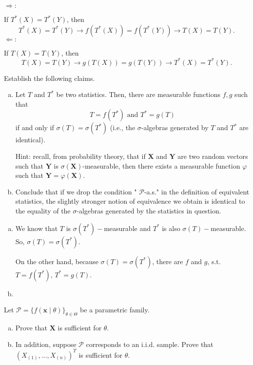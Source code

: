 \begin{solution}
    $\Rightarrow: $

    If $T^*(X)=T^*(Y)$, then
    \[
        T^*(X)=T^*(Y)\rightarrow f(T^*(X))=f(T^*(Y))\rightarrow T(X)=T(Y). 
    \]
    $\Leftarrow: $

    If $T(X)=T(Y)$, then
    \[
        T(X)=T(Y)\rightarrow g(T(X))=g(T(Y))\rightarrow T^*(X)=T^*(Y). 
    \]
\end{solution}

\begin{exercise}
    Establish the following claims. 
    \begin{enumerate}[(a)]
        \item Let \(T\) and \(T^{*}\) be two statistics. Then, there are measurable functions \(f, g\) such that 
        \[
            T=f\left(T^{*}\right)\text{ and }T^{*}=g(T)
        \]
        if and only if \(\sigma(T)=\sigma\left(T^{*}\right)\)
        (i.e., the \(\sigma\)-algebras generated by \(T\) and \(T^{*}\) are identical). 
        
        Hint: recall, from probability theory, that if \(\mathbf{X}\) and \(\mathbf{Y}\) are two random vectors such that \(\mathbf{Y}\) is \(\sigma(\mathbf{X})\)-measurable, then there exists a measurable function \(\varphi\) such that \(\mathbf{Y}=\varphi(\mathbf{X})\). 
        \item Conclude that if we drop the condition " \(\mathcal{P}\)-a.s." in the definition of equivalent statistics, the slightly stronger notion of equivalence we obtain is identical to the equality of the \(\sigma\)-algebras generated by the statistics in question. 
    \end{enumerate}
\end{exercise}

\begin{solution}
    \begin{enumerate}[(a)]
        \item We know that $T$ is $\sigma(T^*)-$measurable and $T^*$ is also $\sigma(T)-$measurable. So, $\sigma(T)=\sigma(T^*)$. 
        
        On the other hand, because $\sigma(T)=\sigma(T^*)$, there are $f$ and $g$, s.t. $T=f(T^*)$, $T^*=g(T)$. 
        \item 
    \end{enumerate}
\end{solution}

\begin{exercise}
    Let \(\mathcal{P}=\{f(\mathbf{x} \mid \theta)\}_{\theta \in \Theta}\) be a parametric family. 
    \begin{enumerate}[(a)]
        \item Prove that \(\mathbf{X}\) is sufficient for \(\theta\). 
        \item In addition, suppose \(\mathcal{P}\) corresponds to an i.i.d. sample. Prove that \(\left(X_{(1)}, \ldots, X_{(n)}\right)^T\) is sufficient for \(\theta\). 
    \end{enumerate}
\end{exercise}

